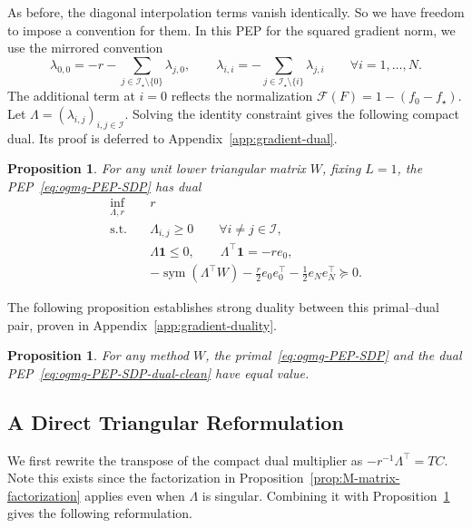 \documentclass[11pt]{article}
\newtheorem{proposition}[thm]{Proposition}
\begin{document}
As before, the diagonal interpolation terms vanish identically. So we have freedom to impose a convention for them. In this
PEP for the squared gradient norm, we use the mirrored convention
\begin{equation}\label{eq:gradient-lambda-diagonal}
    \lambda_{0,0}
    =-r
     -\sum_{j\in\mathcal I_\star\setminus\{0\}}\lambda_{j,0}, \qquad \lambda_{i,i}
    =
     -\sum_{j\in\mathcal I_\star\setminus\{i\}}\lambda_{j,i}
    \qquad \forall i=1,\dots,N.
\end{equation}
The additional term at $i=0$ reflects the normalization
$\mathcal F(F)=1-(f_0-f_\star)$.
Let $\Lambda=(\lambda_{i,j})_{i,j\in\mathcal I}$. Solving the identity
constraint gives the following compact dual. Its proof is deferred to
Appendix~\ref{app:gradient-dual}.
\begin{proposition}\label{prop:gradient-dual}
For any unit lower triangular matrix $W$, fixing $L=1$, the
PEP~\eqref{eq:ogmg-PEP-SDP} has dual
\begin{equation}\label{eq:ogmg-PEP-SDP-dual-clean}
\begin{aligned}
    \inf_{\Lambda,r}\quad &r\\
    \mathrm{s.t.}\quad
    &\Lambda_{i,j}\geq0
    \qquad \forall i\neq j\in\mathcal I,\\
    &\Lambda\mathbf1\leq0,
    \qquad
    \Lambda^\top\mathbf1=-r e_0,\\
    &-\operatorname{sym}(\Lambda^\top W)
      -\frac r2e_0e_0^\top
      -\frac12e_Ne_N^\top
      \succeq0.
\end{aligned}
\end{equation}
\end{proposition}

\noindent The following proposition establishes strong duality between this primal--dual pair, proven in Appendix~\ref{app:gradient-duality}.
\begin{proposition}\label{prop:gradient-duality}
For any method $W$, the primal~\eqref{eq:ogmg-PEP-SDP} and the dual
PEP~\eqref{eq:ogmg-PEP-SDP-dual-clean} have equal value.
\end{proposition}


\subsection{A Direct Triangular Reformulation}
We first rewrite the transpose of the compact dual multiplier as $-r^{-1}\Lambda^\top=TC$.
Note this exists since the factorization in Proposition~\ref{prop:M-matrix-factorization} applies even
when $\Lambda$ is singular. Combining it with
Proposition~\ref{prop:gradient-dual} gives the following reformulation.
\end{document}
